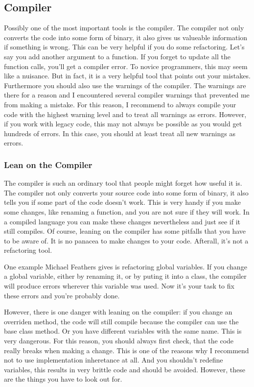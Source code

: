 \subsection{Compiler}

Possibly one of the most important tools is the compiler. The compiler not only converts the code into some form of binary, it also gives us valueable information if something is wrong. This can be very helpful if you do some refactoring. Let's say you add another argument to a function. If you forget to update all the function calls, you'll get a compiler error. To novice programmers, this may seem like a nuisance. But in fact, it is a very helpful tool that points out your mistakes. Furthermore you should also use the warnings of the compiler. The warnings are there for a reason and I encountered several compiler warnings that prevented me from making a mistake. For this reason, I recommend to always compile your code with the highest warning level and to treat all warnings as errors. However, if you work with legacy code, this may not always be possible as you would get hundreds of errors. In this case, you should at least treat all new warnings as errors.


\subsubsection*{Lean on the Compiler}

The compiler is such an ordinary tool that people might forget how useful it is. The compiler not only converts your source code into some form of binary, it also tells you if some part of the code doesn't work. This is very handy if you make some changes, like renaming a function, and you are not sure if they will work. In a compiled language you can make these changes nevertheless and just see if it still compiles. Of course, leaning on the compiler has some pitfalls that you have to be aware of. It is no panacea to make changes to your code. Afterall, it's not a refactoring tool.

One example Michael Feathers gives is refactoring global variables. If you change a global variable, either by renaming it, or by puting it into a class, the compiler will produce errors wherever this variable was used. Now it's your task to fix these errors and you're probably done.

However, there is one danger with leaning on the compiler: if you change an overriden method, the code will still compile because the compiler can use the base class method. Or you have different variables with the same name. This is very dangerous. For this reason, you should always first check, that the code really breaks when making a change. This is one of the reasons why I recommend not to use implementation inheretance at all. And you shouldn't redefine variables, this results in very brittle code and should be avoided. However, these are the things you have to look out for. 

